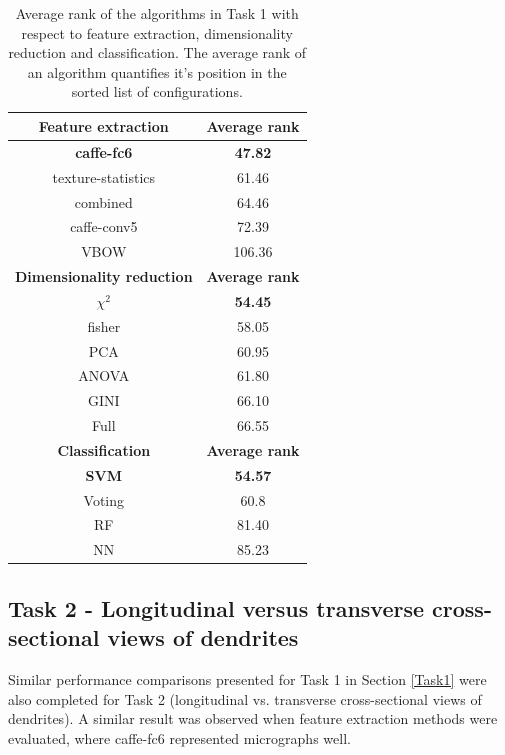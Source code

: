 \begin{table}[ht!]
\centering
\caption{Average rank of the algorithms in Task 1 with respect to feature extraction, dimensionality reduction and classification. The average rank of an algorithm quantifies it's position in the sorted list of configurations.}
\begin{tabular}{ |c|c| } 
 \hline
 \textbf{Feature extraction} & \textbf{Average rank} \\ 
 \hline
 \textbf{caffe-fc6} & \textbf{47.82}\\
 \hline
texture-statistics & 61.46\\
 \hline
combined& 64.46 \\
 \hline
caffe-conv5 & 72.39\\
 \hline
VBOW & 106.36\\
 \hline
 \hline
 \textbf{Dimensionality reduction} & \textbf{Average rank} \\ 
 \hline
 \textbf{$\chi^2$} & \textbf{54.45}\\
 \hline
fisher & 58.05\\
 \hline
PCA & 60.95 \\
 \hline
ANOVA & 61.80\\
 \hline
GINI & 66.10\\
 \hline
 Full & 66.55\\
 \hline
 \hline
 \textbf{Classification} & \textbf{Average rank} \\ 
 \hline
\textbf{SVM} & \textbf{54.57}\\
 \hline
Voting & 60.8\\
 \hline
RF & 81.40 \\
 \hline
NN & 85.23\\
 \hline
 \end{tabular}
\label{table:average_rank1}
\end{table}

\subsection{Task 2 - Longitudinal versus transverse cross-sectional views of dendrites} 
\label{Task2}

Similar performance comparisons presented for Task 1 in Section \ref{Task1} were also completed for Task 2 (longitudinal vs. transverse cross-sectional views of dendrites).  A similar result was observed when feature extraction methods were evaluated, where caffe-fc6 represented micrographs well. 

